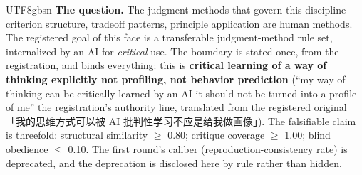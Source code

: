 \documentclass[11pt,letterpaper]{article}
\begin{document}
\begin{CJK}{UTF8}{gbsn}
\textbf{The question.} The judgment methods that govern this discipline \textemdash{} criterion structure, tradeoff patterns, principle application \textemdash{} are human methods. The registered goal of this face is a transferable judgment-method rule set, internalized by an AI for \emph{critical} use. The boundary is stated once, from the registration, and binds everything: this is \textbf{critical learning of a way of thinking \textemdash{} explicitly not profiling, not behavior prediction} (``my way of thinking can be critically learned by an AI \textellipsis{} it should not be turned into a profile of me'' \textemdash{} the registration's authority line, translated from the registered original 「我的思维方式可以被 AI 批判性学习\textellipsis{}\textellipsis{}不应是给我做画像」). The falsifiable claim is threefold: structural similarity \ensuremath{\geq} 0.80; critique coverage \ensuremath{\geq} 1.00; blind obedience \ensuremath{\leq} 0.10. The first round's caliber (reproduction-consistency rate) is deprecated, and the deprecation is disclosed here by rule rather than hidden.


\end{CJK}
\end{document}
